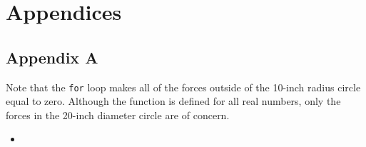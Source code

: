 \documentclass[12pt,letterpaper]{report}
\newcommand{\matlabscript}[2]
{\begin{itemize}\item[]\end{itemize}}
\begin{document}
		\newpage
		\chapter{Appendices}
		\section{Appendix A}
		Note that the \texttt{for} loop makes all of the forces outside of the 10-inch radius circle equal to zero.  Although the function is defined for all real numbers, only the forces in the 20-inch diameter circle are of concern.
			\matlabscript{ForcePlot}{}
\end{document}
